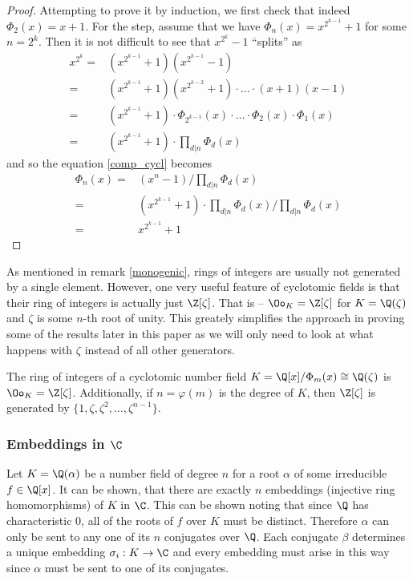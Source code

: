 \begin{proof}
	Attempting to prove it by induction, we first check that indeed $\Phi_2(x) = x+1$. For the step, assume that we have $\Phi_n(x) = x^{2^{k-1}} + 1$ for some $n = 2^k$. Then it is not difficult to see that $x^{2^k} -1$ ``splits'' as 
	\begin{align*}
		x^{2^k} = & (x^{2^{k-1}} + 1)(x^{2^{k-1}} - 1) \\
		= & (x^{2^{k-1}} + 1)(x^{2^{k-2}} + 1) \cdot \ldots \cdot (x+1)(x-1) \\
		= & (x^{2^{k-1}} + 1) \cdot \Phi_{2^{k-1}}(x) \cdot \ldots \cdot \Phi_2(x) \cdot \Phi_1(x) \\
		= & (x^{2^{k-1}} + 1) \cdot \prod_{d | n} \Phi_d(x)
	\end{align*}
	and so the equation \ref{comp_cycl} becomes
	\begin{align*}
		\Phi_n(x) = & (x^n - 1) \Big/ \prod_{d|n} \Phi_d(x) \\
		= & (x^{2^{k-1}} + 1) \cdot \prod_{d|n} \Phi_d(x) \Big/ \prod_{d|n} \Phi_d(x)\\
		= & x^{2^{k-1}} + 1
	\end{align*}
\end{proof}

As mentioned in remark \ref{monogenic}, rings of integers are usually not generated by a single element. However, one very useful feature of cyclotomic fields is that their ring of integers is actually just $\Z[\zeta]$. That is -- $\Oo_K = \Z[\zeta]$ for $K = \Q(\zeta)$ and $\zeta$ is some $n$-th root of unity. This greately simplifies the approach in proving some of the results later in this paper as we will only need to look at what happens with $\zeta$ instead of all other generators.

\begin{proposition}\label{cycl-ok}
	The ring of integers of a cyclotomic number field $K = \Q[x]/\Phi_m(x) \cong \Q(\zeta)$ is $\Oo_K = \Z[\zeta]$. Additionally, if $n = \varphi(m)$ is the degree of $K$, then $\Z[\zeta]$ is generated by $\{1, \zeta, \zeta^2, \dots, \zeta^{n-1} \}$.
\end{proposition}

\subsubsection*{Embeddings in $\C$}
Let $K = \Q(\alpha)$ be a number field of degree $n$ for a root $\alpha$ of some irreducible $f \in \Q[x]$. It can be shown, that there are exactly $n$ embeddings (injective ring homomorphisms) of $K$ in $\C$. This can be shown noting that since $\Q$ has characteristic 0, all of the roots of $f$ over $K$ must be distinct. Therefore $\alpha$ can only be sent to any one of its $n$ conjugates over $\Q$. Each conjugate $\beta$ determines a unique embedding $\sigma_i: K \rightarrow \C$ and every embedding must arise in this way since $\alpha$ must be sent to one of its conjugates.

